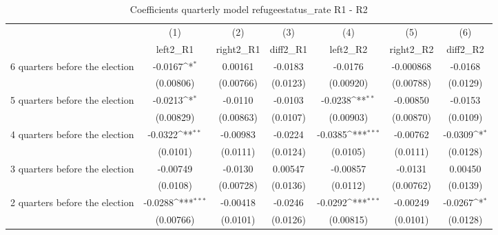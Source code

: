 \begin{table}[!ht]\centering \footnotesize
\def\sym#1{\ifmmode^{#1}\else\(^{#1}\)\fi}
\caption{Coefficients quarterly model refugeestatus\_rate R1 - R2}
\begin{tabular}{l*{6}{c}}
\hline\hline
                    &\multicolumn{1}{c}{(1)}&\multicolumn{1}{c}{(2)}&\multicolumn{1}{c}{(3)}&\multicolumn{1}{c}{(4)}&\multicolumn{1}{c}{(5)}&\multicolumn{1}{c}{(6)}\\
                    &\multicolumn{1}{c}{left2\_R1}&\multicolumn{1}{c}{right2\_R1}&\multicolumn{1}{c}{diff2\_R1}&\multicolumn{1}{c}{left2\_R2}&\multicolumn{1}{c}{right2\_R2}&\multicolumn{1}{c}{diff2\_R2}\\
\hline
 6 quarters before the election&     -0.0167\sym{*}  &     0.00161         &     -0.0183         &     -0.0176         &   -0.000868         &     -0.0168         \\
                    &   (0.00806)         &   (0.00766)         &    (0.0123)         &   (0.00920)         &   (0.00788)         &    (0.0129)         \\
[1em]
 5 quarters before the election&     -0.0213\sym{*}  &     -0.0110         &     -0.0103         &     -0.0238\sym{**} &    -0.00850         &     -0.0153         \\
                    &   (0.00829)         &   (0.00863)         &    (0.0107)         &   (0.00903)         &   (0.00870)         &    (0.0109)         \\
[1em]
 4 quarters before the election&     -0.0322\sym{**} &    -0.00983         &     -0.0224         &     -0.0385\sym{***}&    -0.00762         &     -0.0309\sym{*}  \\
                    &    (0.0101)         &    (0.0111)         &    (0.0124)         &    (0.0105)         &    (0.0111)         &    (0.0128)         \\
[1em]
 3 quarters before the election&    -0.00749         &     -0.0130         &     0.00547         &    -0.00857         &     -0.0131         &     0.00450         \\
                    &    (0.0108)         &   (0.00728)         &    (0.0136)         &    (0.0112)         &   (0.00762)         &    (0.0139)         \\
[1em]
 2 quarters before the election&     -0.0288\sym{***}&    -0.00418         &     -0.0246         &     -0.0292\sym{***}&    -0.00249         &     -0.0267\sym{*}  \\
                    &   (0.00766)         &    (0.0101)         &    (0.0126)         &   (0.00815)         &    (0.0101)         &    (0.0128)         \\

\end{tabular}
\end{table}
